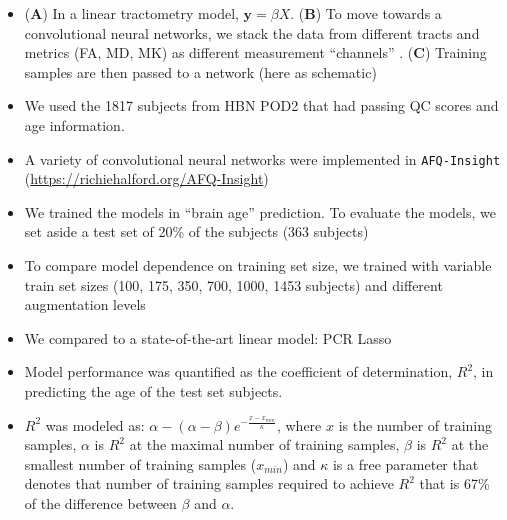 \documentclass[a0paper,landscape,fontscale=0.365]{baposter}
\begin{document}
\begin{poster}
{\begin{itemize}[nosep, leftmargin=*]

\item (\textbf{A}) In a linear tractometry model, $\textbf{y} = \beta X$. (\textbf{B}) To move towards a convolutional neural networks, we stack the data from different tracts and metrics (FA, MD, MK) as different measurement ``channels'' . (\textbf{C}) Training samples are then passed to a network (here as schematic)

\item We used the 1817 subjects from HBN POD2 that had passing QC scores and age
information.

\item A variety of convolutional neural networks were implemented in \texttt{AFQ-Insight} (\url{https://richiehalford.org/AFQ-Insight})

\item We trained the models in ``brain age'' prediction. To evaluate the models, we set aside a test set of 20\% of the subjects (363 subjects)

\item To compare model dependence on training set size, we trained with variable train set sizes (100, 175, 350, 700, 1000, 1453 subjects) and different augmentation levels

\item We compared to a state-of-the-art linear model: PCR Lasso \cite{richford2021sgl}

\item Model performance was quantified as the coefficient of determination, $R^2$, in predicting the age of the test set subjects.

\item $R^2$ was modeled as: $\alpha - (\alpha - \beta) e^{-\frac{x - x_{min}}{\kappa}}$, where $x$ is the number of training samples, $\alpha$ is $R^2$ at the maximal number of training samples, $\beta$ is $R^2$ at the smallest number of training samples ($x_{min}$) and $\kappa$ is a free parameter that denotes that number of training samples required to achieve $R^2$ that is 67\% of the difference between $\beta$ and $\alpha$.

\end{itemize}
}


\end{poster}
\end{document}
